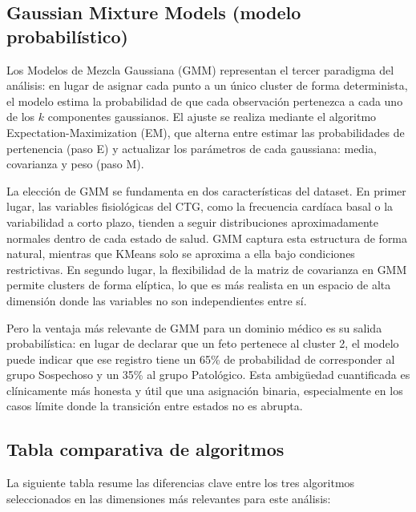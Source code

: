 \documentclass[12pt,letterpaper]{article}
\begin{document}
\subsection{Gaussian Mixture Models (modelo probabilístico)}

Los Modelos de Mezcla Gaussiana (GMM) representan el tercer paradigma del análisis: en lugar de
asignar cada punto a un único cluster de forma determinista, el modelo estima la probabilidad de
que cada observación pertenezca a cada uno de los $k$ componentes gaussianos. El ajuste se realiza
mediante el algoritmo Expectation-Maximization (EM), que alterna entre estimar las probabilidades
de pertenencia (paso E) y actualizar los parámetros de cada gaussiana: media, covarianza y peso
(paso M).

La elección de GMM se fundamenta en dos características del dataset. En primer lugar, las variables
fisiológicas del CTG, como la frecuencia cardíaca basal o la variabilidad a corto plazo, tienden
a seguir distribuciones aproximadamente normales dentro de cada estado de salud. GMM captura esta
estructura de forma natural, mientras que K\-Means solo se aproxima a ella bajo condiciones
restrictivas. En segundo lugar, la flexibilidad de la matriz de covarianza en GMM permite clusters
de forma elíptica, lo que es más realista en un espacio de alta dimensión donde las variables no
son independientes entre sí.

Pero la ventaja más relevante de GMM para un dominio médico es su salida probabilística: en lugar
de declarar que un feto pertenece al cluster 2, el modelo puede indicar que ese registro tiene un
65\% de probabilidad de corresponder al grupo Sospechoso y un 35\% al grupo Patológico. Esta
ambigüedad cuantificada es clínicamente más honesta y útil que una asignación binaria,
especialmente en los casos límite donde la transición entre estados no es abrupta.

\subsection{Tabla comparativa de algoritmos}

La siguiente tabla resume las diferencias clave entre los tres algoritmos seleccionados en las
dimensiones más relevantes para este análisis:
\end{document}
